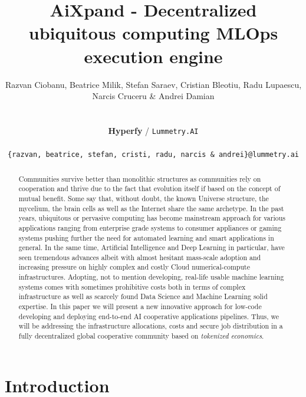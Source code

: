 \documentclass{article}
\title{
AiXpand - Decentralized ubiquitous computing MLOps execution engine
}
\author{
  Razvan Ciobanu, Beatrice Milik, Stefan Saraev, Cristian Bleotiu, \AND Radu Lupaescu, Narcis Cruceru \& Andrei Damian \\\\\\
  \textbf{Hyperfy} / \texttt{Lummetry.AI} \\\\
  \texttt{\{razvan, beatrice, stefan, cristi, radu, narcis \& andrei\}@lummetry.ai} \\
}
\begin{document}
\maketitle


\begin{abstract}
Communities survive better than monolithic structures as communities rely on cooperation and thrive due to the fact that evolution itself if based on the concept of mutual benefit. Some say that, without doubt, the known Universe structure, the mycelium, the brain cells as well as the Internet share the same archetype.
In the past years, ubiquitous or pervasive computing has become mainstream approach for various applications ranging from enterprise grade systems to consumer appliances or gaming systems pushing further the need for automated learning and smart applications in general. In the same time, Artificial Intelligence and Deep Learning in particular, have seen tremendous advances albeit with almost hesitant mass-scale adoption and increasing pressure on highly complex and costly Cloud numerical-compute infrastructures. Adopting, not to mention developing, real-life usable machine learning systems comes with sometimes prohibitive costs both in terms of complex infrastructure as well as scarcely found Data Science and Machine Learning solid expertise. In this paper we will present a new innovative approach for low-code developing and deploying end-to-end AI cooperative applications pipelines. Thus, we will be addressing the infrastructure allocations, costs and secure job distribution in a fully decentralized global cooperative community based on \textit{tokenized economics}.
\end{abstract}



\section{Introduction}
\end{document}
